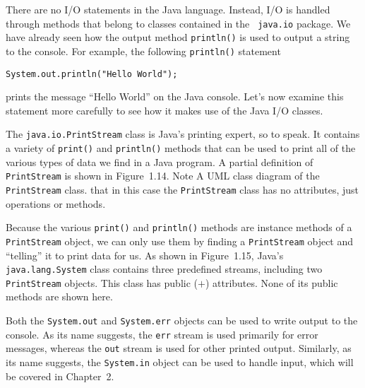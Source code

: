 There are no I/O statements in the Java language.  Instead, I/O is
handled through methods that belong to classes contained in the {\tt
java.io} package. We have already seen how the
output method {\tt println()} is used to output a string
to the console. For example, the following {\tt println()} statement

\begin{jjjlisting}
\begin{lstlisting}
System.out.println("Hello World");
\end{lstlisting}
\end{jjjlisting}

\noindent prints the message ``Hello World'' on the
Java console.  Let's now examine this statement more carefully to see
how it makes use of the Java I/O classes.

The {\tt java.io.PrintStream} class is Java's printing expert, so to
speak. It contains a variety of {\tt print()} and {\tt println()}
methods that can be used to print all of the various types of data we
find in a Java program.  A partial definition of {\tt PrintStream} is
shown in Figure~1.14. Note
{A UML class diagram of the {\tt PrintStream} class.
\label{fig-printstreamUML}
\label{pg-fig-printstreamUML}}
that in this case the {\tt PrintStream} class has no attributes,
just operations or methods.

Because the various {\tt print()} and {\tt println()} methods are
instance methods of a {\tt PrintStream} object, we can only use them
by finding a {\tt PrintStream} object and ``telling'' it to print data
for us.  As shown in Figure~1.15, Java's {\tt java.lang.System} class
contains three predefined streams, including two {\tt PrintStream}
objects. This class has public ($+$) attributes.  None of its public
methods are shown here. 

Both the {\tt System.out} and {\tt System.err} objects can be used to
write output to the console.  As its name suggests, the {\tt err}
stream is used primarily for error messages, whereas the {\tt out}
stream is used for other printed output.  Similarly, as its name
suggests, the {\tt System.in} object can be used to handle input,
which will be covered in Chapter~2.

